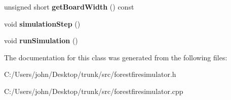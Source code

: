 \begin{DoxyCompactItemize}
\item 
unsigned short {\bfseries get\+Board\+Width} () const \hypertarget{class_forest_fire_simulator_aaccf1d08dcb19a5611aac26462d37139}{}\label{class_forest_fire_simulator_aaccf1d08dcb19a5611aac26462d37139}

\item 
void {\bfseries simulation\+Step} ()\hypertarget{class_forest_fire_simulator_ad42e3ebcd8d970c1798d089b1da1f803}{}\label{class_forest_fire_simulator_ad42e3ebcd8d970c1798d089b1da1f803}

\item 
void {\bfseries run\+Simulation} ()\hypertarget{class_forest_fire_simulator_acdf1e91f15339c9422fedfb992d67457}{}\label{class_forest_fire_simulator_acdf1e91f15339c9422fedfb992d67457}

\end{DoxyCompactItemize}


The documentation for this class was generated from the following files\+:\begin{DoxyCompactItemize}
\item 
C\+:/\+Users/john/\+Desktop/trunk/src/forestfiresimulator.\+h\item 
C\+:/\+Users/john/\+Desktop/trunk/src/forestfiresimulator.\+cpp\end{DoxyCompactItemize}
